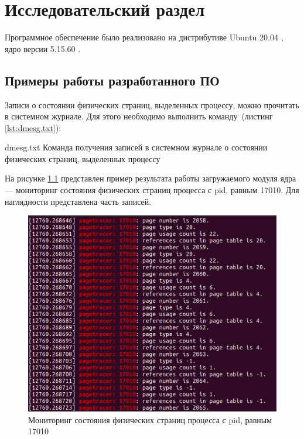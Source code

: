 \chapter{Исследовательский раздел}

Программное обеспечение было реализовано на дистрибутиве Ubuntu 20.04 \cite{ubuntu}, ядро версии 5.15.60 \cite{kernel}.

\section{Примеры работы разработанного ПО}

Записи о состоянии физических страниц, выделенных процессу, можно прочитать в системном журнале. Для этого необходимо выполнить команду~(листинг \ref{lst:dmesg.txt}):

    {dmesg.txt}
    {Команда получения записей в системном журнале о состоянии физических страниц, выделенных процессу}
    
На рисунке \ref{img:example1} представлен пример результата работы загружаемого модуля ядра --- мониторинг состояния физических страниц процесса с pid, равным 17010. Для наглядности представлена часть записей.

\begin{figure}[H]
	\begin{center}
		\includegraphics[scale=0.42]{inc/img/example1.png}
	\end{center}
	\captionsetup{justification=centering}
	\caption{Мониторинг состояния физических страниц процесса с pid, равным 17010}
	\label{img:example1}
\end{figure}

